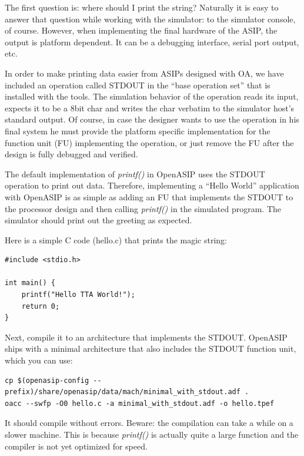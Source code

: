 \documentclass[a4paper,twoside]{tceusermanual}
\begin{document}
The first question is: where should I print the string? Naturally 
it is easy to answer that question while working with the simulator: to
the simulator console, of course. However, when implementing the final
hardware of the ASIP, the output is platform dependent. It can be a
debugging interface, serial port output, etc.

In order to make printing data easier from ASIPs designed
with OA, we have included an operation called STDOUT in the ``base operation 
set'' that is installed with the tools. The simulation behavior of the 
operation reads its input, expects it to be a 8bit char and writes the char
verbatim to the simulator host's standard output. Of course, in case the 
designer wants to use the operation in his final system he must provide the 
platform specific implementation for the function unit (FU) implementing the 
operation, or just remove the FU after the design is fully debugged and
verified.

The default implementation of \textit{printf()} in OpenASIP uses the STDOUT
operation to print out data. Therefore, implementing a ``Hello World''
application with OpenASIP is as simple as adding an FU that implements
the STDOUT to the processor design and then calling \textit{printf()} in
the simulated program. The simulator should print out the greeting
as expected.

Here is a simple C code (hello.c) that prints the magic string:

\begin{verbatim}
#include <stdio.h>

int main() {
    printf("Hello TTA World!");
    return 0;
}
\end{verbatim}

Next, compile it to an architecture that implements the
STDOUT. OpenASIP ships with a minimal architecture that also includes
the STDOUT function unit, which you can use:

\begin{verbatim}
cp $(openasip-config --prefix)/share/openasip/data/mach/minimal_with_stdout.adf .
oacc --swfp -O0 hello.c -a minimal_with_stdout.adf -o hello.tpef
\end{verbatim}


It should compile without errors. Beware: the compilation can take
a while on a slower machine. This is because \textit{printf()} 
is actually quite a large function and the compiler is not yet optimized for 
speed.
\end{document}
